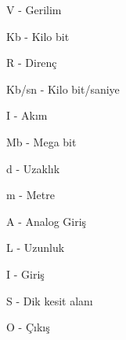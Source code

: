 
\label{CH:BolumKisaltmaSimge}

V			-				Gerilim	

Kb 				-			  Kilo bit

R				-			Direnç 			

Kb/sn -	Kilo bit/saniye

I 				-			 Akım 					

Mb 				-		   Mega bit

d 				-			Uzaklık					

m				-			   Metre
	

A 			-				  Analog Giriş

L 				-		    Uzunluk			

I 			-				   Giriş

S 			-			    Dik kesit alanı 		

O			-				    Çıkış

\clearpage
